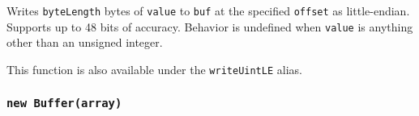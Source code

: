 Writes \texttt{byteLength} bytes of \texttt{value} to \texttt{buf} at
the specified \texttt{offset} as little-endian. Supports up to 48 bits
of accuracy. Behavior is undefined when \texttt{value} is anything other
than an unsigned integer.

This function is also available under the \texttt{writeUintLE} alias.

\begin{Shaded}
\begin{Highlighting}[]
\NormalTok{ \{ }\NormalTok{ \} } \OperatorTok{;}

\OperatorTok{=} \NormalTok{(}\NormalTok{)}\OperatorTok{;}

\NormalTok{(}\OperatorTok{,} \OperatorTok{,} \NormalTok{)}\OperatorTok{;}

\OperatorTok{;}
\end{Highlighting}
\end{Shaded}

\begin{Shaded}
\begin{Highlighting}[]
\NormalTok{ \{ }\NormalTok{ \} }\OperatorTok{=} \NormalTok{(}\NormalTok{)}\OperatorTok{;}

\OperatorTok{=} \NormalTok{(}\NormalTok{)}\OperatorTok{;}

\NormalTok{(}\OperatorTok{,} \OperatorTok{,} \NormalTok{)}\OperatorTok{;}

\OperatorTok{;}
\end{Highlighting}
\end{Shaded}

\subsubsection{\texorpdfstring{\texttt{new\ Buffer(array)}}{new Buffer(array)}}\label{new-bufferarray}

